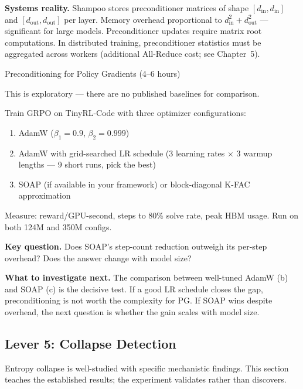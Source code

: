 \textbf{Systems reality.} Shampoo stores preconditioner matrices of shape $[d_{\mathrm{in}}, d_{\mathrm{in}}]$ and $[d_{\mathrm{out}}, d_{\mathrm{out}}]$ per layer. Memory overhead proportional to $d_{\mathrm{in}}^2 + d_{\mathrm{out}}^2$ --- significant for large models. Preconditioner updates require matrix root computations. In distributed training, preconditioner statistics must be aggregated across workers (additional All-Reduce cost; see Chapter~5).

\begin{exercise}{Preconditioning for Policy Gradients (4--6 hours)}

This is exploratory --- there are no published baselines for comparison.

Train GRPO on TinyRL-Code with three optimizer configurations:
\begin{enumerate}[label=(\alph*)]
  \item AdamW ($\beta_1 = 0.9$, $\beta_2 = 0.999$)
  \item AdamW with grid-searched LR schedule ($3$ learning rates $\times$ $3$ warmup lengths --- 9 short runs, pick the best)
  \item SOAP (if available in your framework) or block-diagonal K-FAC approximation
\end{enumerate}

Measure: reward/GPU-second, steps to 80\% solve rate, peak HBM usage. Run on both 124M and 350M configs.

\textbf{Key question.} Does SOAP's step-count reduction outweigh its per-step overhead? Does the answer change with model size?

\textbf{What to investigate next.} The comparison between well-tuned AdamW (b) and SOAP (c) is the decisive test. If a good LR schedule closes the gap, preconditioning is not worth the complexity for PG. If SOAP wins despite overhead, the next question is whether the gain scales with model size.
\end{exercise}

\subsection{Lever 5: Collapse Detection}

Entropy collapse is well-studied with specific mechanistic findings. This section teaches the established results; the experiment validates rather than discovers.

